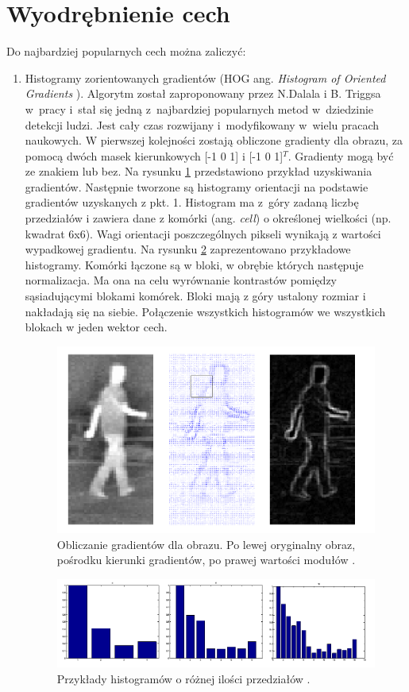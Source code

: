 \section{Wyodrębnienie cech}

Do najbardziej popularnych cech można zaliczyć:

\begin{enumerate}
\item Histogramy zorientowanych gradientów (HOG ang. \textit{Histogram of Oriented Gradients }).
Algorytm został zaproponowany przez N.Dalala i B. Triggsa w~pracy \cite{dalal2005histograms} i~stał się jedną z~najbardziej popularnych metod w~dziedzinie detekcji ludzi. 
Jest cały czas rozwijany i~modyfikowany w~wielu pracach naukowych.
W pierwszej kolejności zostają obliczone gradienty dla obrazu, za pomocą dwóch masek kierunkowych [-1 0 1] i [-1 0 1]$^T$. Gradienty mogą być ze znakiem lub bez. Na rysunku \ref{fig:hog} przedstawiono przykład uzyskiwania gradientów. Następnie tworzone są histogramy orientacji na podstawie gradientów uzyskanych z pkt. 1. Histogram ma z~góry zadaną liczbę przedziałów i zawiera dane z komórki (ang. \textit{cell}) o określonej wielkości (np. kwadrat 6x6). Wagi orientacji poszczególnych pikseli wynikają z wartości wypadkowej gradientu. Na rysunku \ref{fig:hog2} zaprezentowano przykładowe histogramy.
Komórki łączone są w bloki, w obrębie których następuje normalizacja. Ma ona na celu wyrównanie kontrastów pomiędzy sąsiadującymi blokami komórek. Bloki mają z góry ustalony rozmiar i nakładają się na siebie. Połączenie wszystkich histogramów we wszystkich blokach w jeden wektor cech.

\begin{figure}
\centering
\includegraphics[width=0.5\linewidth]{images/hog}
\caption[Obliczanie gradientów dla obrazu.]{Obliczanie gradientów dla obrazu. Po lewej oryginalny obraz, pośrodku kierunki gradientów, po prawej wartości modułów \cite{suard2006pedestrian}.}
\label{fig:hog}
\end{figure}

\begin{figure}
\centering
\includegraphics[width=0.7\linewidth]{images/hog2}
\caption[Przykładowe histogramy]{Przykłady histogramów o różnej ilości przedziałów \cite{suard2006pedestrian}.}
\label{fig:hog2}
\end{figure}


\end{enumerate}
